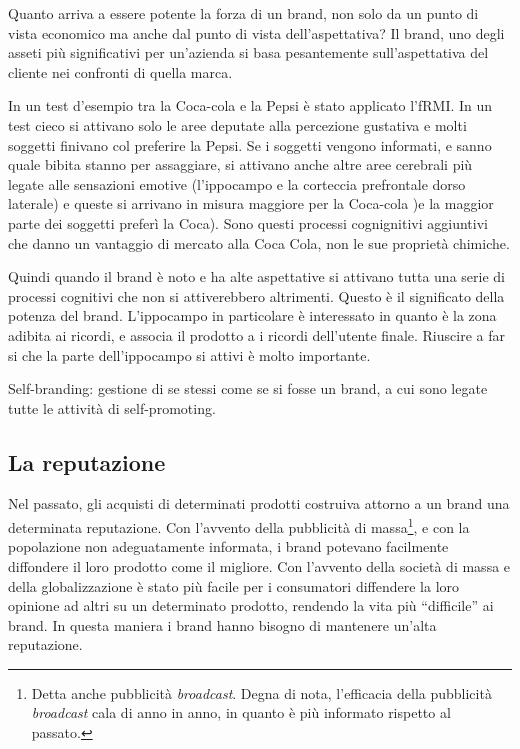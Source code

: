 Quanto arriva a essere potente la forza di un brand, non solo da un punto di
vista economico ma anche dal punto di vista dell'aspettativa?
Il brand, uno degli asseti più significativi per un'azienda si basa
pesantemente sull'aspettativa del cliente nei confronti di quella marca.

In un test d'esempio tra la Coca-cola e la Pepsi è stato applicato l'fRMI. In
un test cieco si attivano solo le aree deputate alla percezione gustativa e
molti soggetti finivano col preferire la Pepsi. Se i soggetti vengono
informati, e sanno quale bibita stanno per assaggiare, si attivano anche altre
aree cerebrali più legate alle sensazioni emotive (l'ippocampo e la corteccia
prefrontale dorso laterale) e queste si arrivano in misura maggiore per la
Coca-cola )e la maggior parte dei soggetti preferì la Coca). Sono questi
processi cognignitivi aggiuntivi che danno un vantaggio di mercato alla Coca
Cola, non le sue proprietà chimiche.

Quindi quando il brand è noto e ha alte aspettative si attivano tutta una serie
di processi cognitivi che non si attiverebbero altrimenti. Questo è il
significato della potenza del brand. L'ippocampo in particolare è interessato
in quanto è la zona adibita ai ricordi, e associa il prodotto a i ricordi
dell'utente finale. Riuscire a far si che la parte dell'ippocampo si attivi è
molto importante.

Self-branding: gestione di se stessi come se si fosse un brand, a cui sono
legate tutte le attività di self-promoting.

\subsection{La reputazione}

Nel passato, gli acquisti di determinati prodotti costruiva attorno a un brand
una determinata reputazione. Con l'avvento della pubblicità di
massa\footnote{Detta anche pubblicità \textit{broadcast}. Degna di nota,
l'efficacia della pubblicità \textit{broadcast} cala di anno in anno, in
quanto è più informato rispetto al passato.}, e con la popolazione non
adeguatamente informata, i brand potevano facilmente diffondere il loro
prodotto come il migliore. Con l'avvento della società di massa e della
globalizzazione è stato più facile per i consumatori diffendere la loro opinione
ad altri su un determinato prodotto, rendendo la vita più ``difficile'' ai
brand. In questa maniera i brand hanno bisogno di mantenere un'alta reputazione.


